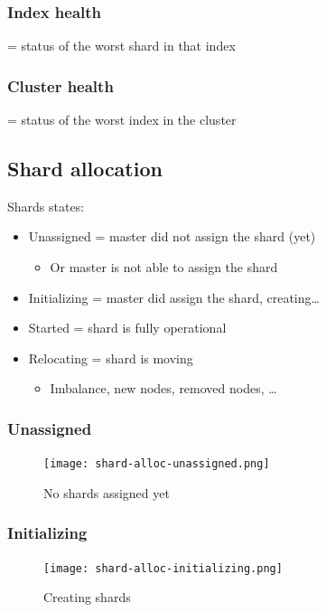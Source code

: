 \documentclass{article}
\begin{document}
\subsubsection{Index health}

= status of the worst shard in that index

\subsubsection{Cluster health}

= status of the worst index in the cluster

\subsection{Shard allocation}

Shards states:

\begin{itemize}
    \item Unassigned = master did not assign the shard (yet)
    \begin{itemize}
        \item Or master is not able to assign the shard
    \end{itemize}
    \item Initializing = master did assign the shard, creating\dots
    \item Started = shard is fully operational
    \item Relocating = shard is moving
    \begin{itemize}
        \item Imbalance, new nodes, removed nodes, \dots
    \end{itemize}
\end{itemize}

\subsubsection{Unassigned}

\begin{figure}[H]
    \centering
    \texttt{[image: shard-alloc-unassigned.png]}
    \caption{No shards assigned yet}
\end{figure}

\subsubsection{Initializing}

\begin{figure}[H]
    \centering
    \texttt{[image: shard-alloc-initializing.png]}
    \caption{Creating shards}
\end{figure}
\end{document}
